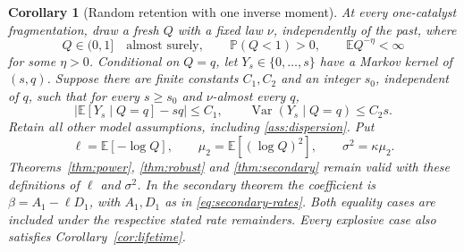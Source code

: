 \documentclass[11pt,a4paper]{article}
\newtheorem{corollary}[theorem]{Corollary}
\theoremstyle{remark}\newtheorem{remark}[theorem]{Remark}
\DeclareMathOperator{\Var}{Var}
\newcommand{\E}{\mathbb E}
\newcommand{\Prob}{\mathbb P}
\begin{document}
\begin{corollary}[Random retention with one inverse moment]\label{cor:random-retention}
At every one-catalyst fragmentation, draw a fresh $Q$ with a fixed law $\nu$, independently of the past, where
\[
Q\in(0,1]\quad\text{almost surely},\qquad
\Prob(Q<1)>0,\qquad \E Q^{-\eta}<\infty
\]
for some $\eta>0$.
Conditional on $Q=q$, let $Y_s\in\{0,\ldots,s\}$ have a Markov kernel of $(s,q)$. Suppose there are finite constants $C_1,C_2$ and an integer $s_0$, independent of $q$, such that for every $s\ge s_0$ and $\nu$-almost every $q$,
\begin{equation}\label{eq:conditional-moments}
\left|\E[Y_s\mid Q=q]-sq\right|\le C_1,\qquad
\Var(Y_s\mid Q=q)\le C_2s.
\end{equation}
Retain all other model assumptions, including \ref{ass:dispersion}. Put
\begin{equation}\label{eq:random-log-moments}
\ell=\E[-\log Q],\qquad \mu_2=\E[(\log Q)^2],\qquad
\sigma^2=\kappa\mu_2.
\end{equation}
Theorems~\ref{thm:power}, \ref{thm:robust} and \ref{thm:secondary} remain valid with these definitions of $\ell$ and $\sigma^2$. In the secondary theorem the coefficient is $\beta=A_1-\ell D_1$, with $A_1,D_1$ as in \eqref{eq:secondary-rates}. Both equality cases are included under the respective stated rate remainders. Every explosive case also satisfies Corollary~\ref{cor:lifetime}.
\end{corollary}
\end{document}
